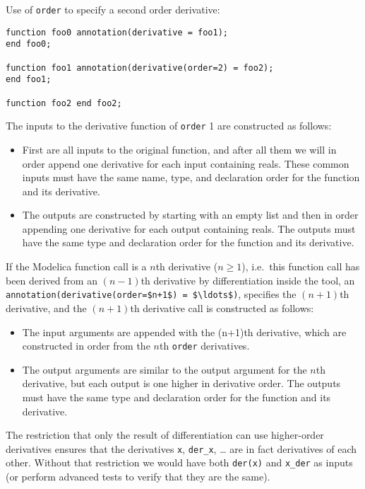 \begin{example}
Use of \lstinline!order! to specify a second order derivative:
\begin{lstlisting}[language=modelica]
function foo0 annotation(derivative = foo1);
end foo0;

function foo1 annotation(derivative(order=2) = foo2);
end foo1;

function foo2 end foo2;
\end{lstlisting}
\end{example}

The inputs to the derivative function of \lstinline!order! 1 are constructed as
follows:
\begin{itemize}
\item
  First are all inputs to the original function, and after all them we
  will in order append one derivative for each input containing reals.
  These common inputs must have the same name, type, and declaration
  order for the function and its derivative.
\item
  The outputs are constructed by starting with an empty list and then in
  order appending one derivative for each output containing reals. The
  outputs must have the same type and declaration order for the function
  and its derivative.
\end{itemize}

If the Modelica function call is a $n$th derivative ($n \geq 1$), i.e.\ this function call has been derived from an $(n-1)$th derivative by differentiation inside the tool, an \lstinline!annotation(derivative(order=$n+1$) = $\ldots$)!, specifies the $(n+1)$th derivative, and the $(n+1)$th derivative call is constructed as follows:
\begin{itemize}
\item
  The input arguments are appended with the (n+1)th derivative, which
  are constructed in order from the $n$th \lstinline!order! derivatives.
\item
  The output arguments are similar to the output argument for the $n$th
  derivative, but each output is one higher in derivative order. The
  outputs must have the same type and declaration order for the function
  and its derivative.
\end{itemize}

\begin{nonnormative}
The restriction that only the result of differentiation can use
higher-order derivatives ensures that the derivatives \lstinline!x!, \lstinline!der_x!,
\ldots{} are in fact derivatives of each other. Without that restriction
we would have both \lstinline!der(x)! and \lstinline!x_der! as inputs (or perform advanced
tests to verify that they are the same).
\end{nonnormative}

